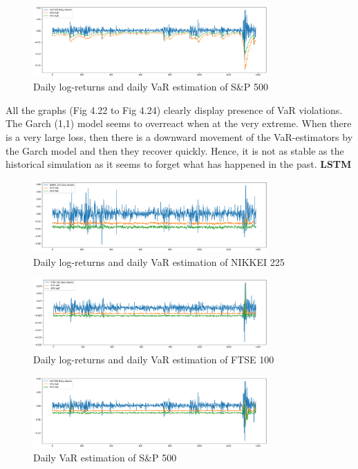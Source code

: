 \documentclass[a4paper,11pt,oneside]{book}
\begin{document}
\begin{figure}[!h]
	\centering
	\includegraphics[width=0.8\textwidth]{figures/GARCHS}
	\caption{Daily log-returns and daily VaR estimation of S\&P 500}
	\label{garchS}
\end{figure}
All the graphs (Fig 4.22 to Fig 4.24) clearly display presence of VaR violations. The Garch (1,1) model seems to overreact when at the very extreme. When there is a very large loss, then there is a downward movement of the VaR-estimators by the Garch model and then they recover quickly. Hence, it is not as stable as the historical simulation as it seems to forget what has happened in the past.
\newpage
\textbf{LSTM}	
\begin{figure}[!h]
	\centering
	\includegraphics[width=0.8\textwidth]{figures/LSTMN}
	\caption{Daily log-returns and daily VaR estimation of NIKKEI 225}
	\label{LSTMN}
\end{figure}

\begin{figure}[!h]
	\centering
	\includegraphics[width=0.8\textwidth]{figures/LSTMF}
	\caption{Daily log-returns and daily VaR estimation of FTSE 100}
	\label{LSTMF}
\end{figure}

\begin{figure}[!h]
	\centering
	\includegraphics[width=0.8\textwidth]{figures/LSTMS}
	\caption{Daily VaR estimation of S\&P 500}
	\label{LSTMS}
\end{figure}	
\end{document}
